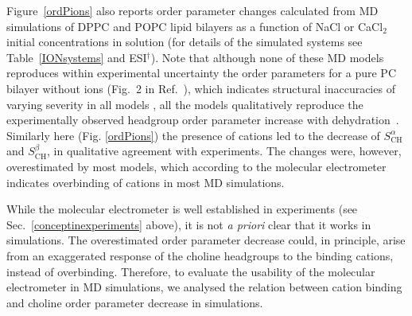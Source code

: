 \documentclass[twoside,twocolumn,9pt]{article}
\begin{document}
Figure~\ref{ordPions} also reports order parameter changes calculated from MD simulations
of DPPC and POPC lipid bilayers as a function of NaCl or CaCl$_2$ initial concentrations in solution
(for details of the simulated systems see Table~\ref{IONsystems} and ESI$^\dag$).
Note that although none of these MD models
reproduces within experimental uncertainty the order parameters for a pure PC bilayer without ions
(Fig.~2 in Ref.~),
which indicates structural inaccuracies of varying severity in all models \cite{botan15},
all the models qualitatively reproduce the experimentally observed
headgroup order parameter increase with dehydration~\cite{botan15}.
Similarly here (Fig. \ref{ordPions}) the presence of cations led to the decrease 
of $S_\mathrm{CH}^\alpha$ and $S_\mathrm{CH}^\beta$, in qualitative
agreement with experiments. The changes were, however, overestimated by most models, which
according to the molecular electrometer indicates overbinding of cations in most MD simulations.

While the molecular electrometer is well established in experiments (see Sec.~\ref{conceptinexperiments} above),
it is not {\it a priori} clear that it works in simulations. The overestimated order parameter
decrease could, in principle, arise from an exaggerated response of the choline headgroups to the binding cations,
instead of overbinding.
Therefore, to evaluate the usability of the molecular electrometer in MD simulations,
we analysed the relation between cation binding and choline order parameter decrease in simulations.
\end{document}
